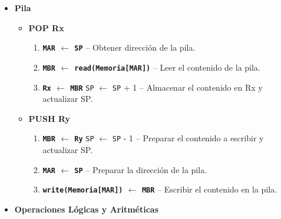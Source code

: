 \documentclass[12pt,oneside]{templates/unerthesis}
\providecommand{\tightlist}{%
  \setlength{\itemsep}{0pt}\setlength{\parskip}{0pt}}
\begin{document}
\begin{itemize}
\begin{itemize}
\begin{itemize}
      \begin{enumerate}
      \def\labelenumi{\arabic{enumi}.}
      \setcounter{enumi}{3}
      \tightlist
      \item
        \textbf{\texttt{MAR} \(\leftarrow\) \texttt{IP}} -- Obtener dirección del dato inmediato.
      \item
        \textbf{\texttt{MBR} \(\leftarrow\) \texttt{read(Memoria{[}MAR{]})} \textbar{} \texttt{IP} \(\leftarrow\) \texttt{IP} + 1} -- Leer el dato e incrementar IP.
      \item
        \textbf{\texttt{MAR} \(\leftarrow\) \texttt{MBR}} -- Preparar la dirección del puerto de entrada..
      \item
        \textbf{\texttt{MBR} \(\leftarrow\) \texttt{read(E-S{[}MAR{]})}} -- Leer el contenido del puerto.
      \item
        \textbf{\texttt{AL} \(\leftarrow\) \texttt{MBR}} -- Almacenar el contenido en AL.
      \end{enumerate}
    \end{itemize}
  \end{itemize}
\item
  \textbf{Pila}

  \begin{itemize}
  \tightlist
  \item
    \textbf{POP Rx}

    \begin{enumerate}
    \def\labelenumi{\arabic{enumi}.}
    \setcounter{enumi}{3}
    \tightlist
    \item
      \textbf{\texttt{MAR} \(\leftarrow\) \texttt{SP}} -- Obtener dirección de la pila.
    \item
      \textbf{\texttt{MBR} \(\leftarrow\) \texttt{read(Memoria{[}MAR{]})}} -- Leer el contenido de la pila.
    \item
      \textbf{\texttt{Rx} \(\leftarrow\) \texttt{MBR}} \textbar{} \texttt{SP} \(\leftarrow\) \texttt{SP} + 1 -- Almacenar el contenido en Rx y actualizar SP.
    \end{enumerate}
  \item
    \textbf{PUSH Ry}

    \begin{enumerate}
    \def\labelenumi{\arabic{enumi}.}
    \setcounter{enumi}{3}
    \tightlist
    \item
      \textbf{\texttt{MBR} \(\leftarrow\) \texttt{Ry}} \textbar{} \texttt{SP} \(\leftarrow\) \texttt{SP} - 1 -- Preparar el contenido a escribir y actualizar SP.\\
    \item
      \textbf{\texttt{MAR} \(\leftarrow\) \texttt{SP}} -- Preparar la dirección de la pila.
    \item
      \textbf{\texttt{write(Memoria{[}MAR{]})} \(\leftarrow\) \texttt{MBR}} -- Escribir el contenido en la pila.
    \end{enumerate}
  \end{itemize}
\item
  \textbf{Operaciones Lógicas y Aritméticas}


\end{itemize}
\end{document}
